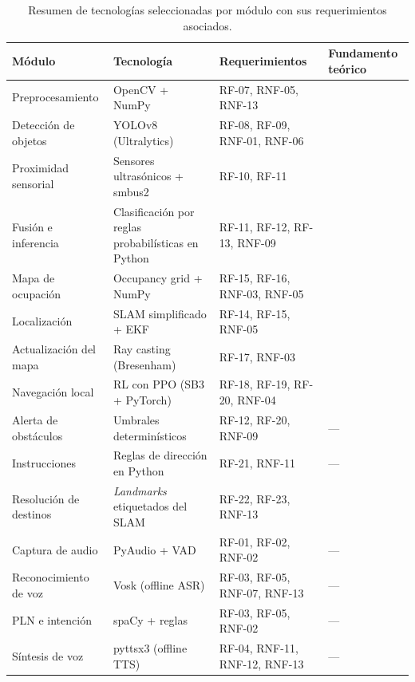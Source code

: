 \begin{table}[H]
\centering
\renewcommand{\arraystretch}{1.3}
\begin{tabular}{p{3.2cm} p{3.5cm} p{3.2cm} p{3.2cm}}
\hline
\textbf{Módulo} & \textbf{Tecnología} & \textbf{Requerimientos} & \textbf{Fundamento teórico} \\
\hline
Preprocesamiento & OpenCV + NumPy & RF-07, RNF-05, RNF-13 & \cite{unitxlabs_prepost} \\
Detección de objetos & YOLOv8 (Ultralytics) & RF-08, RF-09, RNF-01, RNF-06 & \cite{geeksforgeeks_object_detection} \\
Proximidad sensorial & Sensores ultrasónicos + smbus2 & RF-10, RF-11 & \cite{hcsr04_datasheet} \\
Fusión e inferencia & Clasificación por reglas probabilísticas en Python & RF-11, RF-12, RF-13, RNF-09 & \cite{ibm2025_mltypes} \\
\hline
Mapa de ocupación & Occupancy grid + NumPy & RF-15, RF-16, RNF-03, RNF-05 & \cite{elfes1989} \\
Localización & SLAM simplificado + EKF & RF-14, RF-15, RNF-05 & \cite{thrun2005probabilistic} \\
Actualización del mapa & Ray casting (Bresenham) & RF-17, RNF-03 & \cite{elfes1989, bresenham1965} \\
\hline
Navegación local & RL con PPO (SB3 + PyTorch) & RF-18, RF-19, RF-20, RNF-04 & \cite{ibm2025_mltypes} \\
Alerta de obstáculos & Umbrales determinísticos & RF-12, RF-20, RNF-09 & --- \\
Instrucciones & Reglas de dirección en Python & RF-21, RNF-11 & --- \\
Resolución de destinos & \emph{Landmarks} etiquetados del SLAM & RF-22, RF-23, RNF-13 & \cite{thrun2005probabilistic} \\
\hline
Captura de audio & PyAudio + VAD & RF-01, RF-02, RNF-02 & --- \\
Reconocimiento de voz & Vosk (offline ASR) & RF-03, RF-05, RNF-07, RNF-13 & --- \\
PLN e intención & spaCy + reglas & RF-03, RF-05, RNF-02 & --- \\
Síntesis de voz & pyttsx3 (offline TTS) & RF-04, RNF-11, RNF-12, RNF-13 & --- \\
\hline
\end{tabular}
\caption{Resumen de tecnologías seleccionadas por módulo con sus requerimientos asociados.}
\label{tabla_tecnologias}
\end{table}